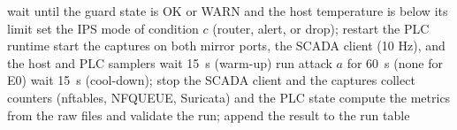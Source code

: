 \begin{algorithm}[t]
\caption{One experimental run (condition $c$, attack $a$).}\label{alg:run}
\begin{algorithmic}[1]
\footnotesize
\State wait until the guard state is OK or WARN and the host temperature is below its limit
\State set the IPS mode of condition $c$ (router, alert, or drop); restart the PLC runtime
\State start the captures on both mirror ports, the SCADA client (10 Hz), and the host and PLC samplers
\State wait 15~s (warm-up)
\State run attack $a$ for 60~s (none for E0)
\State wait 15~s (cool-down); stop the SCADA client and the captures
\State collect counters (nftables, NFQUEUE, Suricata) and the PLC state
\State compute the metrics from the raw files and validate the run; append the result to the run table
\end{algorithmic}
\end{algorithm}
